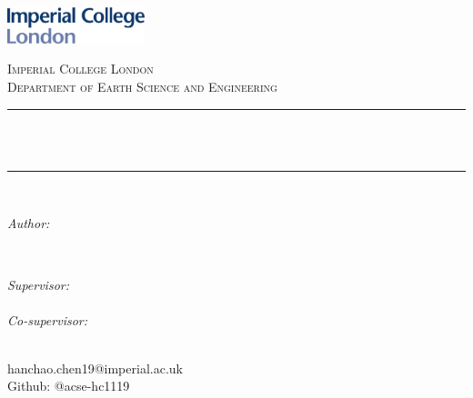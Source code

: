 \begin{titlepage}

\newcommand{\HRule}{\rule{\linewidth}{0.5mm}} %



\includegraphics[width = 4cm]{./figures/imperial}\\[0.5cm] 

\center %

\vspace{50pt}
\textsc{\Large Imperial College London}\\[0.5cm] 
\textsc{\large Department of Earth Science and Engineering}\\[0.5cm] 


\HRule \\[0.4cm]
{ \huge \bfseries \reporttitle}\\ %
\HRule \\[1.5cm]
 

\begin{minipage}{0.4\textwidth}
\begin{flushleft} \large
\emph{Author:}\\
\reportauthor %
\end{flushleft}
\end{minipage}
~
\begin{minipage}{0.4\textwidth}
\begin{flushright} \large
\emph{Supervisor:} \\
\supervisor \\%
\emph{Co-supervisor:} \\
\cosupervisor %
\end{flushright}
\end{minipage}\\[4cm]


\vfill %
hanchao.chen19@imperial.ac.uk \\
Github: @acse-hc1119




\end{titlepage}

